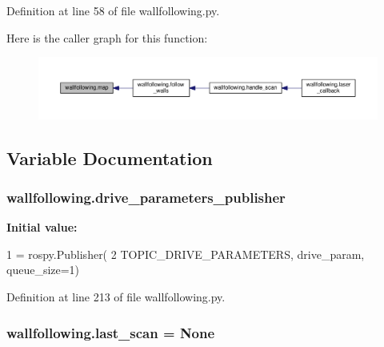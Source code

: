 Definition at line 58 of file wallfollowing.\+py.



Here is the caller graph for this function\+:
\nopagebreak
\begin{figure}[H]
\begin{center}
\leavevmode
\includegraphics[width=350pt]{namespacewallfollowing_a908b60b64e20dec7078e707a829b610d_icgraph}
\end{center}
\end{figure}




\subsection{Variable Documentation}
\subsubsection[{\texorpdfstring{drive\+\_\+parameters\+\_\+publisher}{drive_parameters_publisher}}]{\setlength{\rightskip}{0pt plus 5cm}wallfollowing.\+drive\+\_\+parameters\+\_\+publisher}\hypertarget{namespacewallfollowing_aa69138defbbc5f21e99db50a6b3c903f}{}\label{namespacewallfollowing_aa69138defbbc5f21e99db50a6b3c903f}
{\bfseries Initial value\+:}
\begin{DoxyCode}
1 = rospy.Publisher(
2     TOPIC\_DRIVE\_PARAMETERS, drive\_param, queue\_size=1)
\end{DoxyCode}


Definition at line 213 of file wallfollowing.\+py.

\subsubsection[{\texorpdfstring{last\+\_\+scan}{last_scan}}]{\setlength{\rightskip}{0pt plus 5cm}wallfollowing.\+last\+\_\+scan = None}\hypertarget{namespacewallfollowing_ab6c7c8e53e8b1cd44872666515dd5764}{}\label{namespacewallfollowing_ab6c7c8e53e8b1cd44872666515dd5764}


